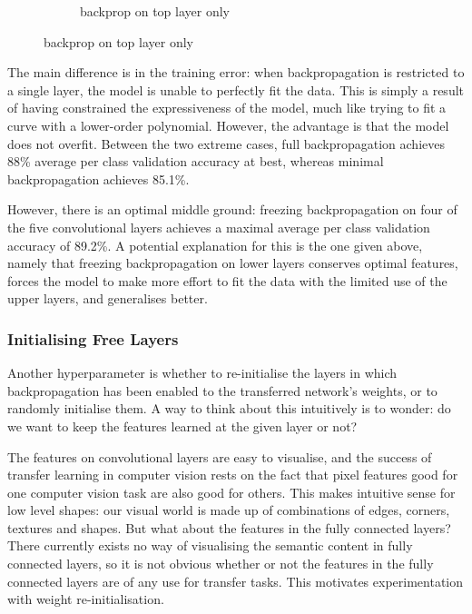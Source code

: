 \documentclass[a4paper,11pt]{article}
\begin{document}
\begin{figure}
\begin{minipage}[b]{\textwidth}
\begin{subfigure}{.5\textwidth}
        \caption{backprop on top layer only}\label{fig:2b}
      \end{subfigure} \par \vspace*{20pt} %
    \end{minipage}%
\end{figure}

The main difference is in the training error: when backpropagation is restricted to a single layer, the model is unable to perfectly fit the data. This is simply a result of having constrained the expressiveness of the model, much like trying to fit a curve with a lower-order polynomial. However, the advantage is that the model does not overfit. Between the two extreme cases, full backpropagation achieves 88\% average per class validation accuracy at best, whereas minimal backpropagation achieves 85.1\%. 

However, there is an optimal middle ground: freezing backpropagation on four of the five convolutional layers achieves a maximal average per class validation accuracy of 89.2\%. A potential explanation for this is the one given above, namely that freezing backpropagation on lower layers conserves optimal features, forces the model to make more effort to fit the data with the limited use of the upper layers, and generalises better. \\


\subsubsection{Initialising Free Layers}

Another hyperparameter is whether to re-initialise the layers in which backpropagation has been enabled to the transferred network's weights, or to randomly initialise them. A way to think about this intuitively is to wonder: do we want to keep the features learned at the given layer or not? 

The features on convolutional layers are easy to visualise, and the success of transfer learning in computer vision rests on the fact that pixel features good for one computer vision task are also good for others. This makes intuitive sense for low level shapes: our visual world is made up of combinations of edges, corners, textures and shapes. But what about the features in the fully connected layers? There currently exists no way of visualising the semantic content in fully connected layers, so it is not obvious whether or not the features in the fully connected layers are of any use for transfer tasks. This motivates experimentation with weight re-initialisation. 
\end{document}
